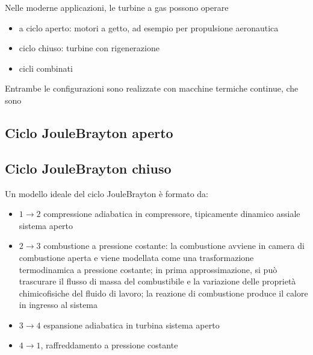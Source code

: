 \documentclass[letterpaper,10pt,italian]{jupyterBook}
\begin{document}
\sphinxAtStartPar
Nelle moderne applicazioni, le turbine a gas possono operare
\begin{itemize}
\item {} 
\sphinxAtStartPar
a ciclo aperto: motori a getto, ad esempio per propulsione aeronautica

\item {} 
\sphinxAtStartPar
ciclo chiuso: turbine con rigenerazione

\item {} 
\sphinxAtStartPar
cicli combinati

\end{itemize}

\sphinxAtStartPar
Entrambe le configurazioni sono realizzate con macchine termiche continue, che sono   


\subsection{Ciclo Joule\sphinxhyphen{}Brayton aperto}
\label{\detokenize{ch/thermodynamics/heat-engine-joule-brayton:ciclo-joule-brayton-aperto}}

\subsection{Ciclo Joule\sphinxhyphen{}Brayton chiuso}
\label{\detokenize{ch/thermodynamics/heat-engine-joule-brayton:ciclo-joule-brayton-chiuso}}
\sphinxAtStartPar
Un modello ideale del ciclo Joule\sphinxhyphen{}Brayton è formato da:
\begin{itemize}
\item {} 
\sphinxAtStartPar
\(1 \rightarrow 2\) compressione adiabatica in compressore, tipicamente dinamico assiale \sphinxhyphen{} sistema aperto

\item {} 
\sphinxAtStartPar
\(2 \rightarrow 3\) combustione a pressione costante: la combustione avviene in camera di combustione aperta e viene modellata come una trasformazione termodinamica a pressione costante; in prima approssimazione, si può trascurare il flusso di massa del combustibile e la variazione delle proprietà chimico\sphinxhyphen{}fisiche del fluido di lavoro; la reazione di combustione produce il calore in ingresso al sistema

\item {} 
\sphinxAtStartPar
\(3 \rightarrow 4\) espansione adiabatica in turbina \sphinxhyphen{} sistema aperto

\item {} 
\sphinxAtStartPar
\(4 \rightarrow 1\), raffreddamento a pressione costante

\end{itemize}
\end{document}
